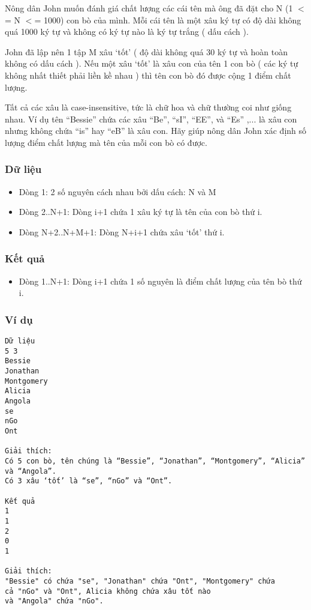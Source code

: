 



   Nông dân John muốn đánh giá chất lượng các cái tên mà ông đã đặt  cho N (1 $<$= N $<$= 1000) con bò của mình. Mỗi cái tên là một xâu ký tự  có độ dài không quá 1000 ký tự và không có ký tự nào là ký tự trắng ( dấu cách ).  

   John đã lập nên 1 tập M xâu ‘tốt’ ( độ dài không quá 30 ký tự và hoàn  toàn không có dấu cách ). Nếu một xâu ‘tốt’ là xâu con của tên 1 con  bò ( các ký tự không nhất thiết phải liền kề nhau ) thì tên con bò đó  được cộng 1 điểm chất lượng.  

   Tất cả các xâu là case-insensitive, tức là chữ hoa và chữ thường coi  như giống nhau. Ví dụ tên “Bessie” chứa các xâu “Be”, “sI”, “EE”,  và “Es” ,... là xâu con nhưng không chứa “is” hay “eB” là xâu  con. Hãy giúp nông dân John xác định số lượng điểm chất lượng mà  tên của mỗi con bò có được.  

\subsubsection{   Dữ liệu  }
\begin{itemize}
	\item     Dòng 1: 2 số nguyên cách nhau bởi dấu cách: N và M   
	\item     Dòng 2..N+1: Dòng i+1 chứa 1 xâu ký tự là tên của con bò thứ i.   
	\item     Dòng N+2..N+M+1: Dòng N+i+1 chứa xâu ‘tốt’ thứ i.   
\end{itemize}

\subsubsection{   Kết quả  }
\begin{itemize}
	\item     Dòng 1..N+1: Dòng i+1 chứa 1 số nguyên là điểm chất lượng của tên bò thứ i.   
\end{itemize}

\subsubsection{   Ví dụ  }
\begin{verbatim}
Dữ liệu
5 3
Bessie
Jonathan
Montgomery
Alicia
Angola
se
nGo
Ont

Giải thích:
Có 5 con bò, tên chúng là “Bessie”, “Jonathan”, “Montgomery”, “Alicia” và “Angola”.
Có 3 xâu ‘tốt’ là “se”, “nGo” và “Ont”.

Kết quả
1
1
2
0
1

Giải thích:
"Bessie" có chứa "se", "Jonathan" chứa "Ont", "Montgomery" chứa 
cả "nGo" và "Ont", Alicia không chứa xâu tốt nào 
và "Angola" chứa "nGo".
\end{verbatim}